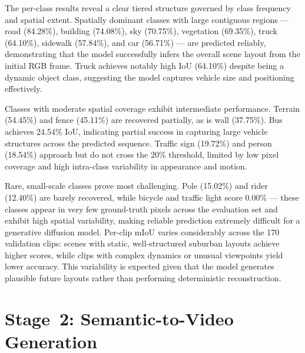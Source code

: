 The per-class results reveal a clear tiered structure governed by class frequency and spatial extent. Spatially dominant classes with large contiguous regions — road (84.28\%), building (74.08\%), sky (70.75\%), vegetation (69.35\%), truck (64.10\%), sidewalk (57.84\%), and car (56.71\%) — are predicted reliably, demonstrating that the model successfully infers the overall scene layout from the initial RGB frame. Truck achieves notably high IoU (64.10\%) despite being a dynamic object class, suggesting the model captures vehicle size and positioning effectively.

Classes with moderate spatial coverage exhibit intermediate performance. Terrain (54.45\%) and fence (45.11\%) are recovered partially, as is wall (37.75\%). Bus achieves 24.54\% IoU, indicating partial success in capturing large vehicle structures across the predicted sequence. Traffic sign (19.72\%) and person (18.54\%) approach but do not cross the 20\% threshold, limited by low pixel coverage and high intra-class variability in appearance and motion.

Rare, small-scale classes prove most challenging. Pole (15.02\%) and rider (12.40\%) are barely recovered, while bicycle and traffic light score 0.00\% — these classes appear in very few ground-truth pixels across the evaluation set and exhibit high spatial variability, making reliable prediction extremely difficult for a generative diffusion model. Per-clip mIoU varies considerably across the 170 validation clips: scenes with static, well-structured suburban layouts achieve higher scores, while clips with complex dynamics or unusual viewpoints yield lower accuracy. This variability is expected given that the model generates plausible future layouts rather than performing deterministic reconstruction.

\FloatBarrier
\section{Stage~2: Semantic-to-Video Generation}
\label{sec:stage2_results}

